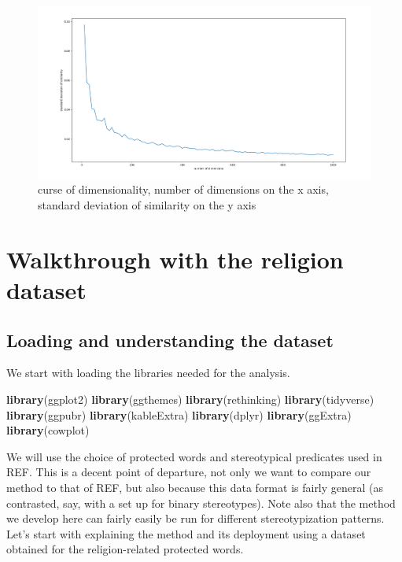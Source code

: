 \documentclass[12pt,]{book}
\newenvironment{Shaded}{\begin{snugshade}}{\end{snugshade}}
\newcommand{\KeywordTok}[1]{\textcolor[rgb]{0.13,0.29,0.53}{\textbf{#1}}}
\newcommand{\NormalTok}[1]{#1}
\begin{document}
\begin{figure}
\centering
\includegraphics{../images/curseOfDimensionality.png}
\caption{curse of dimensionality, number of dimensions on the x axis,
standard deviation of similarity on the y axis}
\end{figure}

\chapter{Walkthrough with the religion
dataset}\label{walkthrough-with-the-religion-dataset}

\section{Loading and understanding the
dataset}\label{loading-and-understanding-the-dataset}

We start with loading the libraries needed for the analysis.

\footnotesize

\begin{Shaded}
\begin{Highlighting}[]
\KeywordTok{library}\NormalTok{(ggplot2)}
\KeywordTok{library}\NormalTok{(ggthemes)}
\KeywordTok{library}\NormalTok{(rethinking)}
\KeywordTok{library}\NormalTok{(tidyverse)}
\KeywordTok{library}\NormalTok{(ggpubr)}
\KeywordTok{library}\NormalTok{(kableExtra)}
\KeywordTok{library}\NormalTok{(dplyr)}
\KeywordTok{library}\NormalTok{(ggExtra)}
\KeywordTok{library}\NormalTok{(cowplot)}
\end{Highlighting}
\end{Shaded}

\normalsize 

We will use the choice of protected words and stereotypical predicates
used in REF. This is a decent point of departure, not only we want to
compare our method to that of REF, but also because this data format is
fairly general (as contrasted, say, with a set up for binary
stereotypes). Note also that the method we develop here can fairly
easily be run for different stereotypization patterns. Let's start with
explaining the method and its deployment using a dataset obtained for
the religion-related protected words.
\end{document}

